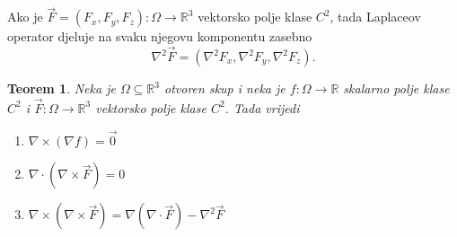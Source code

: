 \documentclass[12pt,a4paper]{article}
\newtheorem{tm}{Teorem}[section]
\begin{document}
Ako je
$
\overrightarrow{F}
=
(F_x,F_y,F_z)
:
\Omega\to\mathbb{R}^3
$
vektorsko polje klase $C^2$, tada Laplaceov operator djeluje na svaku
njegovu komponentu zasebno
$$
\nabla^2\overrightarrow{F}
=
\left(
\nabla^2F_x,
\nabla^2F_y,
\nabla^2F_z
\right).
$$
\begin{tm}
Neka je $\Omega\subseteq\mathbb{R}^3$ otvoren skup i neka je
$f:\Omega\to\mathbb{R}$ skalarno polje klase $C^2$ i
$\overrightarrow{F}:\Omega\to\mathbb{R}^3$ vektorsko polje klase $C^2$.
Tada vrijedi

\begin{enumerate}
    \item[(i)]
    $
    \nabla\times(\nabla f)
    =
    \overrightarrow{0}
    $

    \item[(ii)]
    $
    \nabla\cdot(\nabla\times\overrightarrow{F})
    =
    0
    $

    \item[(iii)]
    $
    \nabla\times(\nabla\times\overrightarrow{F})
    =
    \nabla(\nabla\cdot\overrightarrow{F})
    -
    \nabla^2\overrightarrow{F}
    $
\end{enumerate}
\end{tm}
\end{document}
